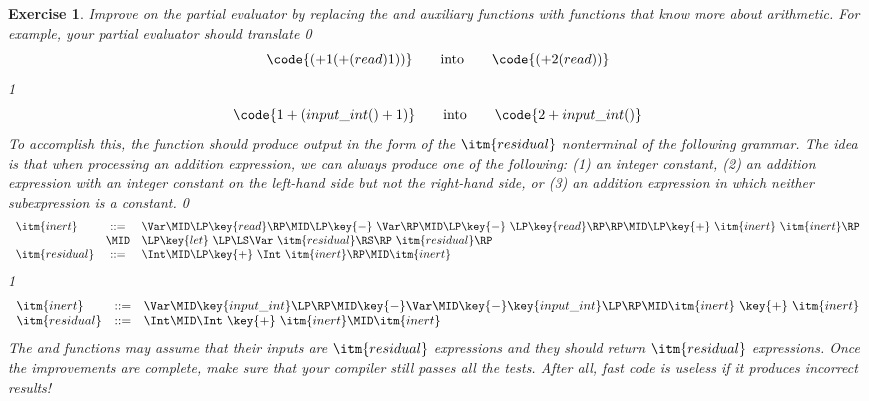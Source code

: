 \documentclass[7x10]{TimesAPriori_MIT}%
\def\racketEd{0}
\def\pythonEd{1}
\def\edition{1}
\newcommand{\pythonColor}[0]{}
\newtheorem{exercise}[theorem]{Exercise}
\numberwithin{theorem}{chapter}
\numberwithin{definition}{chapter}
\numberwithin{equation}{chapter}
\begin{document}
\begin{exercise}
\normalfont\normalsize

Improve on the partial evaluator by replacing the  and
 auxiliary functions with functions that know more about
arithmetic. For example, your partial evaluator should translate
{\if\edition\racketEd
\[
\code{(+ 1 (+ (read) 1))} \qquad \text{into} \qquad
\code{(+ 2 (read))}
\]
\fi}
{\if\edition\pythonEd\pythonColor
\[
\code{1 + (input\_int() + 1)} \qquad \text{into} \qquad
\code{2 + input\_int()}
\]
\fi}
%
To accomplish this, the  function should produce output
in the form of the $\itm{residual}$ nonterminal of the following
grammar. The idea is that when processing an addition expression, we
can always produce one of the following: (1) an integer constant, (2)
an addition expression with an integer constant on the left-hand side
but not the right-hand side, or (3) an addition expression in which
neither subexpression is a constant.
%
{\if\edition\racketEd
\[
\begin{array}{lcl}
  \itm{inert} &::=& \Var
    \MID \LP\key{read}\RP
    \MID \LP\key{-} ~\Var\RP
    \MID \LP\key{-} ~\LP\key{read}\RP\RP
    \MID \LP\key{+} ~ \itm{inert} ~ \itm{inert}\RP\\
    &\MID& \LP\key{let}~\LP\LS\Var~\itm{residual}\RS\RP~ \itm{residual} \RP \\  
  \itm{residual} &::=& \Int
    \MID \LP\key{+}~ \Int~ \itm{inert}\RP
    \MID \itm{inert} 
\end{array}
\]
\fi}
{\if\edition\pythonEd\pythonColor
\[
\begin{array}{lcl}
  \itm{inert} &::=& \Var
    \MID \key{input\_int}\LP\RP
    \MID \key{-} \Var
    \MID \key{-} \key{input\_int}\LP\RP
    \MID \itm{inert} ~ \key{+} ~ \itm{inert}\\
  \itm{residual} &::=& \Int
    \MID \Int ~ \key{+} ~ \itm{inert}
    \MID \itm{inert} 
\end{array}
\]
\fi}
The  and  functions may assume that their
inputs are $\itm{residual}$ expressions and they should return
$\itm{residual}$ expressions.  Once the improvements are complete,
make sure that your compiler still passes all the tests.  After
all, fast code is useless if it produces incorrect results!
\end{exercise}
\end{document}
